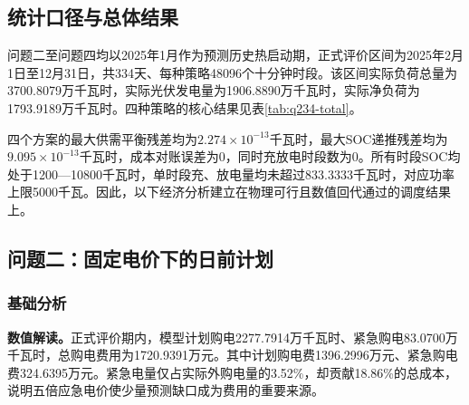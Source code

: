 \documentclass[UTF8,a4paper,12pt,fontset=fandol]{ctexart}
\numberwithin{equation}{section}
\begin{document}
\subsection{统计口径与总体结果}

问题二至问题四均以2025年1月作为预测历史热启动期，正式评价区间为2025年2月1日至12月31日，共334天、每种策略48096个十分钟时段。该区间实际负荷总量为3700.8079万千瓦时，实际光伏发电量为1906.8890万千瓦时，实际净负荷为1793.9189万千瓦时。四种策略的核心结果见表\ref{tab:q234-total}。

\begin{table}[H]
\centering
\caption{问题二至问题四正式评价期总体结果}
\label{tab:q234-total}
\end{table}

四个方案的最大供需平衡残差均为$2.274\times10^{-13}$千瓦时，最大SOC递推残差均为$9.095\times10^{-13}$千瓦时，成本对账误差为0，同时充放电时段数为0。所有时段SOC均处于1200---10800千瓦时，单时段充、放电量均未超过833.3333千瓦时，对应功率上限5000千瓦。因此，以下经济分析建立在物理可行且数值回代通过的调度结果上。

\subsection{问题二：固定电价下的日前计划}

\subsubsection{基础分析}

\textbf{数值解读。}正式评价期内，模型计划购电2277.7914万千瓦时、紧急购电83.0700万千瓦时，总购电费用为1720.9391万元。其中计划购电费1396.2996万元、紧急购电费324.6395万元。紧急电量仅占实际外购电量的3.52\%，却贡献18.86\%的总成本，说明五倍应急电价使少量预测缺口成为费用的重要来源。
\end{document}
